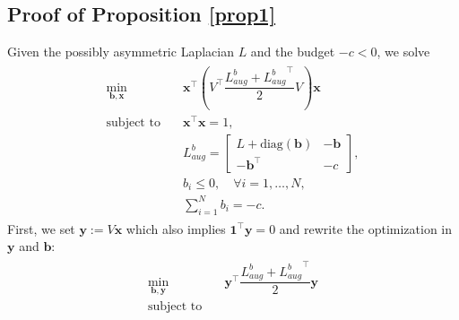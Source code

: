 \documentclass[%
 reprint,
 amsmath,amssymb,
 aip,
]{revtex4-2}
\def \bx {\pmb{x}}
\def \by {\pmb{y}}
\def \bb {\pmb{b}}
\def \bone {\pmb{1}}
\def \diag {\text{diag}}
\theoremstyle{italichead}
\theoremstyle{definition}
\begin{document}
{\subsection{Proof of Proposition \ref{prop1}} \label{sec:prop1}

Given the possibly asymmetric Laplacian $L$ and the budget $-c < 0$, we solve
        \begin{align}
        \begin{split}
            \min_{\bb, \bx } \quad 
            & \bx^\top \left(V^\top \dfrac{{L_{aug}^b}+{L_{aug}^b}^\top}{2} V \right)\bx \\
            \text{subject to} \quad 
            & \bx^\top \bx = 1 , \\
            & L_{aug}^b = \begin{bmatrix}
                L + \text{diag}(\bb) & -\bb \\
                -\bb^\top & -c
            \end{bmatrix}, \\
            & b_i \leq 0, \quad \forall i = 1, \hdots, N,\\
            & \sum_{i=1}^N b_i = -c.
        \end{split}
        \end{align}
    First, we set $\by:= V\bx$ which also implies $\bone^\top \by = 0$ and rewrite the optimization in $\by$ and $\bb$:
        \begin{align}
        \begin{split}
            \min_{\bb, \by } \quad 
            & \by^\top \dfrac{{L_{aug}^b}+{L_{aug}^b}^\top}{2} \by \\
            \text{subject to} \quad 

\end{split}
\end{align}}
\end{document}

